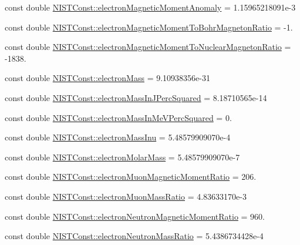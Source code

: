 \begin{DoxyCompactItemize}
\item 
const double \hyperlink{group___n_i_s_t_const-_electron_gaf1a0633191464e7a695240858b9b407c}{N\+I\+S\+T\+Const\+::electron\+Magnetic\+Moment\+Anomaly} = 1.\+15965218091e-\/3
\item 
const double \hyperlink{group___n_i_s_t_const-_electron_ga921889f482e157189bf19818e428532f}{N\+I\+S\+T\+Const\+::electron\+Magnetic\+Moment\+To\+Bohr\+Magneton\+Ratio} = -\/1.
\item 
const double \hyperlink{group___n_i_s_t_const-_electron_ga2c0f984bb3ae4dd8ca2696d4fec8f9bf}{N\+I\+S\+T\+Const\+::electron\+Magnetic\+Moment\+To\+Nuclear\+Magneton\+Ratio} = -\/1838.
\item 
const double \hyperlink{group___n_i_s_t_const-_electron_ga2c9773ce81cfbe85e9042adccd788589}{N\+I\+S\+T\+Const\+::electron\+Mass} = 9.\+10938356e-\/31
\item 
const double \hyperlink{group___n_i_s_t_const-_electron_gad128828903af19e91fdc1a95ef9cbb24}{N\+I\+S\+T\+Const\+::electron\+Mass\+In\+J\+Perc\+Squared} = 8.\+18710565e-\/14
\item 
const double \hyperlink{group___n_i_s_t_const-_electron_ga6a41b7cbd78c00ef17e9b17944ab5f5c}{N\+I\+S\+T\+Const\+::electron\+Mass\+In\+Me\+V\+Perc\+Squared} = 0.
\item 
const double \hyperlink{group___n_i_s_t_const-_electron_gaa6fc2ab3a81cd61f6d78d64eec8a670d}{N\+I\+S\+T\+Const\+::electron\+Mass\+Inu} = 5.\+48579909070e-\/4
\item 
const double \hyperlink{group___n_i_s_t_const-_electron_gaebecd54c70326d72d25d790c0ab62145}{N\+I\+S\+T\+Const\+::electron\+Molar\+Mass} = 5.\+48579909070e-\/7
\item 
const double \hyperlink{group___n_i_s_t_const-_electron_gacd4a3b462095f6b3ec3de099a34b9726}{N\+I\+S\+T\+Const\+::electron\+Muon\+Magnetic\+Moment\+Ratio} = 206.
\item 
const double \hyperlink{group___n_i_s_t_const-_electron_ga6b6bb303de5ee3bd95d18e8024880eea}{N\+I\+S\+T\+Const\+::electron\+Muon\+Mass\+Ratio} = 4.\+83633170e-\/3
\item 
const double \hyperlink{group___n_i_s_t_const-_electron_ga556c66115bf01b011616c5675e8b33c1}{N\+I\+S\+T\+Const\+::electron\+Neutron\+Magnetic\+Moment\+Ratio} = 960.
\item 
const double \hyperlink{group___n_i_s_t_const-_electron_gad051ac865a63e667306850054f912ab1}{N\+I\+S\+T\+Const\+::electron\+Neutron\+Mass\+Ratio} = 5.\+4386734428e-\/4

\end{DoxyCompactItemize}
